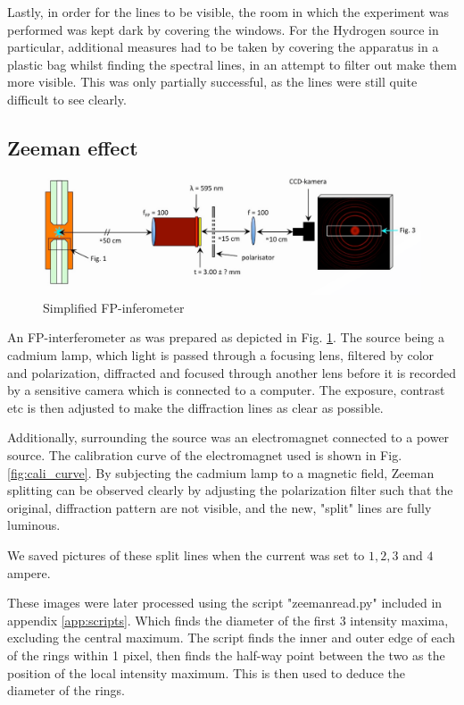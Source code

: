 \documentclass[11pt,a4paper]{article}
\begin{document}
    Lastly, in order for the lines to be visible, the room in which the experiment was performed was kept dark by covering the windows. For the Hydrogen source in particular, additional measures had to be taken by covering the apparatus in a plastic bag whilst finding the spectral lines, in an attempt to filter out make them more visible. This was only partially successful, as the lines were still quite difficult to see clearly.

    \subsection{Zeeman effect\label{sect:zeeman_expt}}
      \begin{figure}[H]
        \center
        \includegraphics[width=15cm]{scripts/figs/ZEEMAN_EXPERIMENTAL.png}
        \caption{Simplified FP-inferometer}
        \label{FP-inferometer}
      \end{figure}

      An FP-interferometer as was prepared as depicted in Fig. \ref{FP-inferometer}. The source being a cadmium lamp, which light is passed through a focusing lens, filtered by color and polarization, diffracted and focused through another lens before it is recorded by a sensitive camera which is connected to a computer. The exposure, contrast etc is then adjusted to make the diffraction lines as clear as possible.

      Additionally, surrounding the source was an electromagnet connected to a power source. The calibration curve of the electromagnet used is shown in Fig. \ref{fig:cali_curve}. By subjecting the cadmium lamp to a magnetic field, Zeeman splitting can be observed clearly by adjusting the polarization filter such that the original, diffraction pattern are not visible, and the new, "split" lines are fully luminous.

      We saved pictures of these split lines when the current was set to $1, 2, 3$ and $4$ ampere.

      These images were later processed using the script "zeemanread.py" included in appendix \ref{app:scripts}. Which finds the diameter of the first 3 intensity maxima, excluding the central maximum. The script finds the inner and outer edge of each of the rings within 1 pixel, then finds the half-way point between the two as the position of the local intensity maximum. This is then used to deduce the diameter of the rings.
\end{document}
